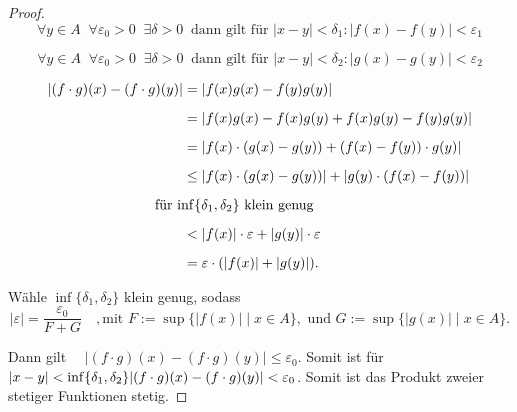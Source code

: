 \documentclass[a4paper,12pt]{article}
\theoremstyle{definition}
\theoremstyle{remark}
\begin{document}
\begin{proof}
  
  \[
    \forall y \in A \;\; \forall \varepsilon_0 > 0 \;\; \exists \delta > 0 \;\; 
    \text{dann gilt für } |x-y| < \delta_1 : |f(x) - f(y)| < \varepsilon_1
    \]
    
    \[
      \forall y \in A \;\; \forall \varepsilon_0 > 0 \;\; \exists \delta > 0 \;\; 
      \text{dann gilt für } |x-y| < \delta_2 : |g(x) - g(y)| < \varepsilon_2
      \]
      
      \begin{align*}
        |(f \cdot g)(x) - (f \cdot g)(y)| 
        &= | f(x) g(x) - f(y) g(y) | \\[2mm]
        &= | f(x) g(x) - f(x) g(y) + f(x) g(y) - f(y) g(y) | \\[2mm]
        &= | f(x) \cdot (g(x) - g(y)) + (f(x) - f(y)) \cdot g(y) | \\[2mm]
        &\leq | f(x) \cdot (g(x) - g(y)) | + | g(y) \cdot (f(x) - f(y)) | \\[2mm]
        \makebox[0pt][l]{\hspace{-2em}für $\inf\{\delta_1, \delta_2\}$ klein genug} \\[2mm]
        &< | f(x) | \cdot \varepsilon + | g(y) | \cdot \varepsilon  \\[2mm]
        & = \varepsilon \cdot (|f(x)| + |g(y)|).
      \end{align*}
      
      Wähle $\inf\{\delta_1, \delta_2\}$ klein genug, sodass 
      \[
        \vert \varepsilon \vert = \frac{\varepsilon_0}{F + G} \quad,
        \text{mit }
        F := \sup \{ |f(x)| \mid x \in A \}, 
        \text{ und }
G := \sup \{ |g(x)| \mid x \in A \}.
\]

Dann gilt $\quad |(f \cdot g)(x) - (f \cdot g)(y)| \leq \varepsilon_0.$ Somit ist für 
$\vert x-y \vert < \inf\{\delta_1, \delta_2\} \\ \vert(f\cdot g)(x) - (f\cdot g)(y)\vert < \varepsilon_0$. 
Somit ist das Produkt zweier stetiger Funktionen stetig. 


\end{proof}
\end{document}
